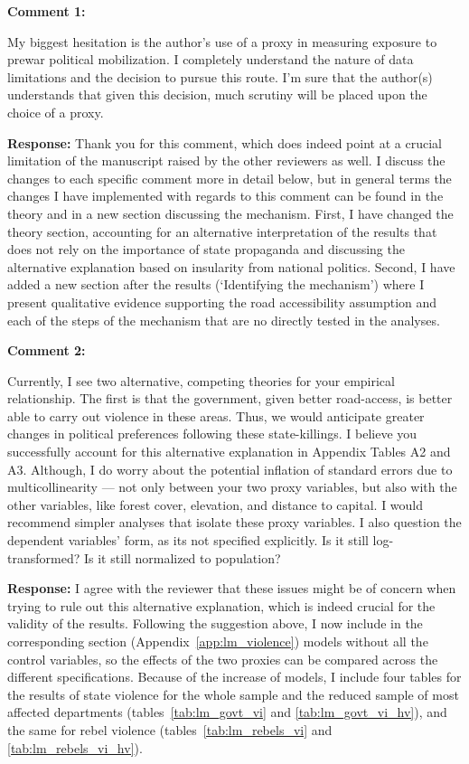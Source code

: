\documentclass[12pt, a4paper, notitlepage]{article}
\begin{document}
\vspace{15pt}
\noindent\textbf{Comment 1:}
\begin{displayquote}
My biggest hesitation is the author’s use of a proxy in measuring exposure to prewar political mobilization. I completely understand the nature of data limitations and the decision to pursue this route. I’m sure that the author(s) understands that given this decision, much scrutiny will be placed upon the choice of a proxy.
\end{displayquote}

\noindent\textbf{Response:} Thank you for this comment, which does indeed point at a crucial limitation of the manuscript raised by the other reviewers as well. I discuss the changes to each specific comment more in detail below, but in general terms the changes I have implemented with regards to this comment can be found in the theory and in a new section discussing the mechanism.
First, I have changed the theory section, accounting for an alternative interpretation of the results that does not rely on the importance of state propaganda and discussing the alternative explanation based on insularity from national politics.
Second, I have added a new section after the results (`Identifying the mechanism') where I present qualitative evidence supporting the road accessibility assumption and each of the steps of the mechanism that are no directly tested in the analyses.

\vspace{15pt}
\noindent\textbf{Comment 2:}
\begin{displayquote}
Currently, I see two alternative, competing theories for your empirical relationship. The first is that the government, given better road-access, is better able to carry out violence in these areas. Thus, we would anticipate greater changes in political preferences following these state-killings. I believe you successfully account for this alternative explanation in Appendix Tables A2 and A3. Although, I do worry about the potential inflation of standard errors due to multicollinearity — not only between your two proxy variables, but also with the other variables, like forest cover, elevation, and distance to capital. I would recommend simpler analyses that isolate these proxy variables. I also question the dependent variables’ form, as its not specified explicitly. Is it still log- transformed? Is it still normalized to population?
\end{displayquote}

\noindent\textbf{Response:} I agree with the reviewer that these issues might be of concern when trying to rule out this alternative explanation, which is indeed crucial for the validity of the results. Following the suggestion above, I now include in the corresponding section (Appendix~\ref{app:lm_violence}) models without all the control variables, so the effects of the two proxies can be compared across the different specifications.
Because of the increase of models, I include four tables for the results of state violence for the whole sample and the reduced sample of most affected departments (tables~\ref{tab:lm_govt_vi} and \ref{tab:lm_govt_vi_hv}), and the same for rebel violence (tables~\ref{tab:lm_rebels_vi} and \ref{tab:lm_rebels_vi_hv}).
\end{document}

